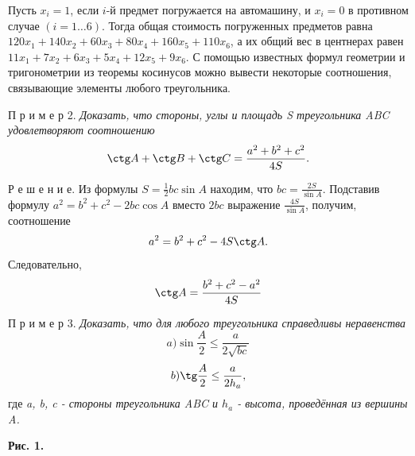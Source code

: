 \begin{multicols}{2}
Пусть $x_i=1$, если $i$-й предмет погружается на автомашину, и $x_i=0$ в противном случае $(i=1\dots6)$. Тогда общая стоимость погруженных предметов равна $120x_1+140x_2+60x_3+80x_4+160x_5+110x_6$, а их общий вес в центнерах равен $11x_1+7x_2+6x_3+5x_4+12x_5+9x_6$.
\newpage
С помощью известных формул геометрии и тригонометрии из теоремы косинусов можно вывести некоторые соотношения, связывающие элементы любого треугольника.

П р и м е р 2. \textit{Доказать, что стороны, углы и площадь S треугольника ABC удовлетворяют соотношению} \[\ctg A+\ctg B+\ctg C=\frac{a^2+b^2+c^2}{4S}.\]

Р е ш е н и е. Из формулы $S=\frac{1}{2}bc\sin A$ находим, что $bc=\frac{2S}{\sin A}.$ Подставив формулу $a^2=b^2+c^2-2bc\cos A$ вместо $2bc$ выражение $\frac{4S}{\sin A}$, получим, соотношение \begin{equation}
    a^2=b^2+c^2-4S\ctg A.
\end{equation}
Следовательно, \[\ctg A=\frac{b^2+c^2-a^2}{4S}\]

П р и м е р 3. \textit{Доказать, что для любого треугольника справедливы неравенства}
\[a) \sin \frac{A}{2}\leq\frac{a}{2\sqrt{bc}}\]\[b) \tg\frac{A}{2}\leq\frac{a}{2h_a},\]
где \textit{a, b, c - стороны треугольника ABC и $h_a$ - высота, проведённая из вершины A.}
\end{multicols}

\newpage
{}

\textbf{Рис. 1.}
